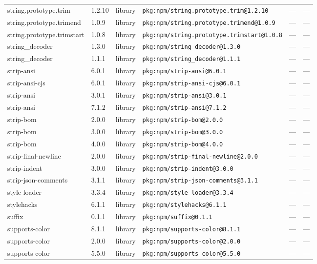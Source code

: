 \documentclass[11pt]{article}
\begin{document}
\begin{longtable}{|l|l|l|p{2.2cm}|l|p{4cm}|}
string.prototype.trim & 1.2.10 & library & \texttt{pkg:npm/string.prototype.trim@1.2.10} & — & — \\
string.prototype.trimend & 1.0.9 & library & \texttt{pkg:npm/string.prototype.trimend@1.0.9} & — & — \\
string.prototype.trimstart & 1.0.8 & library & \texttt{pkg:npm/string.prototype.trimstart@1.0.8} & — & — \\
string\_decoder & 1.3.0 & library & \texttt{pkg:npm/string\_decoder@1.3.0} & — & — \\
string\_decoder & 1.1.1 & library & \texttt{pkg:npm/string\_decoder@1.1.1} & — & — \\
strip-ansi & 6.0.1 & library & \texttt{pkg:npm/strip-ansi@6.0.1} & — & — \\
strip-ansi-cjs & 6.0.1 & library & \texttt{pkg:npm/strip-ansi-cjs@6.0.1} & — & — \\
strip-ansi & 3.0.1 & library & \texttt{pkg:npm/strip-ansi@3.0.1} & — & — \\
strip-ansi & 7.1.2 & library & \texttt{pkg:npm/strip-ansi@7.1.2} & — & — \\
strip-bom & 2.0.0 & library & \texttt{pkg:npm/strip-bom@2.0.0} & — & — \\
strip-bom & 3.0.0 & library & \texttt{pkg:npm/strip-bom@3.0.0} & — & — \\
strip-bom & 4.0.0 & library & \texttt{pkg:npm/strip-bom@4.0.0} & — & — \\
strip-final-newline & 2.0.0 & library & \texttt{pkg:npm/strip-final-newline@2.0.0} & — & — \\
strip-indent & 3.0.0 & library & \texttt{pkg:npm/strip-indent@3.0.0} & — & — \\
strip-json-comments & 3.1.1 & library & \texttt{pkg:npm/strip-json-comments@3.1.1} & — & — \\
style-loader & 3.3.4 & library & \texttt{pkg:npm/style-loader@3.3.4} & — & — \\
stylehacks & 6.1.1 & library & \texttt{pkg:npm/stylehacks@6.1.1} & — & — \\
suffix & 0.1.1 & library & \texttt{pkg:npm/suffix@0.1.1} & — & — \\
supports-color & 8.1.1 & library & \texttt{pkg:npm/supports-color@8.1.1} & — & — \\
supports-color & 2.0.0 & library & \texttt{pkg:npm/supports-color@2.0.0} & — & — \\
supports-color & 5.5.0 & library & \texttt{pkg:npm/supports-color@5.5.0} & — & — \\

\end{longtable}
\end{document}
